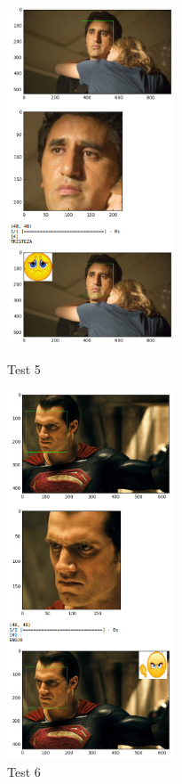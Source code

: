 \begin{frame}
\begin{figure}[!htbp]
\begin{multicols}{2}
           
            \includegraphics[angle=0,width=50mm]{Imagenes/test5.png}
              \caption{Test 5}
              \label{fig:test5}   
              
              \includegraphics[angle=0,width=50mm]{Imagenes/test6.png}
                  \caption{Test 6}
                  \label{fig:test6}   
                  
                  
    \end{multicols}
        
\end{figure}
\end{frame}


